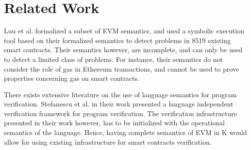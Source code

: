 \section{Related Work} Luu et al.\cite{luumaking} formalized a subset of EVM
semantics, and used a symbolic execution tool based on their formalized
semantics to detect problems in 8519 existing smart contracts. Their semantics
however, are incomplete, and can only be used to detect a limited class of
problems. For instance, their semantics do not consider the role of gas in
Ethereum transactions, and cannot be used to prove properties concerning gas on
smart contracts.

There exists extensive literature on the use of language semantics for program
verification. Stefanescu et al.
\cite{stefanescu-park-yuwen-li-rosu-2016-oopsla} in their work presented a
language independent verification framework for program verification. The
verification infrastructure presented in their work however, has to be
initialized with the operational semantics of the language. Hence, having
complete semantics of EVM in K would allow for using existing infrastructure
for smart contracts verification.

